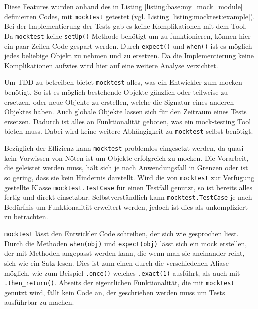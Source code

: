 Diese Features wurden anhand des in Listing \ref{listing:base:my_mock_module}
definierten Codes, mit \lstinline{mocktest} getestet (vgl. Listing
\ref{listing:mocktest:example}). Bei der Implementierung der Tests gab es keine
Komplikationen mit dem Tool. Da \lstinline{mocktest} keine \lstinline{setUp()}
Methode benötigt um zu funktionieren, können hier ein paar Zeilen Code gespart
werden. Durch \lstinline{expect()} und \lstinline{when()} ist es möglich jedes
beliebige Objekt zu nehmen und zu ersetzen. Da die Implementierung keine
Komplikationen aufwies wird hier auf eine weitere Analyse verzichtet.
\newline

Um TDD zu betreiben bietet \lstinline{mocktest} alles, was ein Entwickler zum
\gls{mock}en benötigt. So ist es möglich bestehende Objekte gänzlich oder
teilweise zu ersetzen, oder neue Objekte zu erstellen, welche die Signatur eines
anderen Objektes haben. Auch globale Objekte lassen sich für den Zeitraum eines
Tests ersetzen. Dadurch ist alles an Funktionalität geboten, was ein
\gls{mock}-testing Tool bieten muss. Dabei wird keine weitere Abhängigkeit zu
\lstinline{mocktest} selbst benötigt.

Bezüglich der Effizienz kann \lstinline{mocktest} problemlos eingesetzt werden,
da quasi kein Vorwissen von Nöten ist um Objekte erfolgreich zu \gls{mock}en.
Die Vorarbeit, die geleistet werden muss, hält sich je nach Anwendungsfall in
Grenzen oder ist so gering, dass sie kein Hindernis darstellt. Wird die von
\lstinline{mocktest} zur Verfügung gestellte Klasse
\lstinline{mocktest.TestCase} für einen Testfall genutzt, so ist bereits alles
fertig und direkt einsetzbar. Selbstverständlich kann
\lstinline{mocktest.TestCase} je nach Bedürfnis um Funktionalität erweitert
werden, jedoch ist dies als unkompliziert zu betrachten.

\lstinline{mocktest} lässt den Entwickler Code schreiben, der sich wie
gesprochen liest. Durch die Methoden \lstinline{when(obj)} und
\lstinline{expect(obj)} lässt sich ein \Gls{mock} erstellen, der mit Methoden
angepasst werden kann, die wenn man sie aneinander reiht, sich wie ein Satz
lesen. Dies ist zum einen durch die verschiedenen Aliase möglich, wie zum
Beispiel \lstinline{.once()} welches \lstinline{.exact(1)} ausführt, als auch
mit \lstinline{.then_return()}. Abseits der eigentlichen Funktionalität, die
mit \lstinline{mocktest} genutzt wird, fällt kein Code an, der geschrieben
werden muss um Tests ausführbar zu machen.